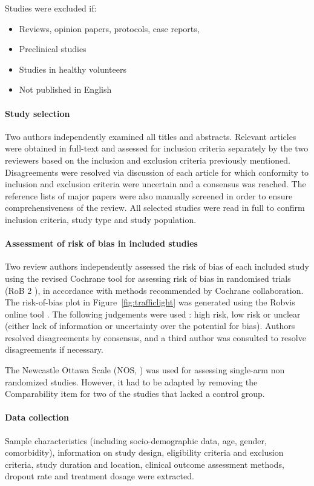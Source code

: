 Studies were excluded if: 
\begin{itemize}
    \item Reviews, opinion papers, protocols, case reports,
    \item Preclinical studies
    \item Studies in healthy volunteers
    \item Not published in English
\end{itemize}

\paragraph{Study selection}
Two authors independently examined all titles and abstracts. Relevant articles were obtained in full-text and assessed for inclusion criteria separately by the two reviewers based on the inclusion and exclusion criteria previously mentioned. Disagreements were resolved via discussion of each article for which conformity to inclusion and exclusion criteria were uncertain and a consensus was reached. The reference lists of major papers were also manually screened in order to ensure comprehensiveness of the review. All selected studies were read in full to confirm inclusion criteria, study type and study population.

\paragraph{Assessment of risk of bias in included studies} 
Two review authors independently assessed the risk of bias of each included study using the revised Cochrane tool for assessing risk of bias in randomised trials (RoB 2 \cite{sterne2019rob}), in accordance with methods recommended by Cochrane collaboration. The risk-of-bias plot in Figure~\ref{fig:trafficlight} was generated using the Robvis online tool \cite{mcguinness_risk--bias_2021}. The following judgements were used : high risk, low risk or unclear (either lack of information or uncertainty over the potential for bias). Authors resolved disagreements by consensus, and a third author was consulted to resolve disagreements if necessary.

The Newcastle Ottawa Scale (NOS, \cite{peterson2011newcastle}) was used for assessing single-arm non randomized studies. However, it had to be adapted by removing the Comparability item for two of the studies that lacked a control group.

\paragraph{Data collection}
Sample characteristics (including socio-demographic data, age, gender, comorbidity), information on study design, eligibility criteria and exclusion criteria, study duration and location, clinical outcome assessment methods, dropout rate and treatment dosage were extracted.